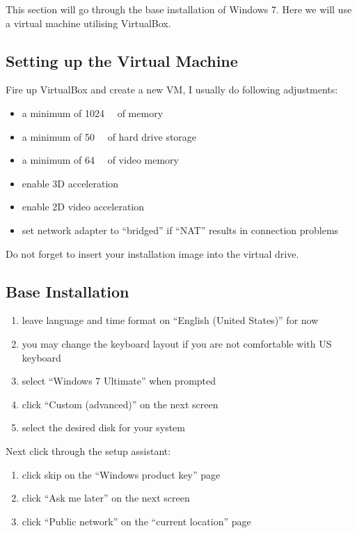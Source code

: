 \documentclass{itsarticle}
\begin{document}
This section will go through the base installation of Windows 7. Here we will
use a virtual machine utilising VirtualBox\footnotemark.


\subsection{Setting up the Virtual Machine}
\label{ssec:virtual_box}

Fire up VirtualBox and create a new VM, I usually do following adjustments:

\begin{itemize}
    \item a minimum of \SI{1024}{\mega\byte} of memory
    \item a minimum of \SI{50}{\giga\byte} of hard drive storage
    \item a minimum of \SI{64}{\mega\byte} of video memory
    \item enable 3D acceleration
    \item enable 2D video acceleration
    \item set network adapter to ``bridged'' if ``NAT'' results in connection
        problems
\end{itemize}

Do not forget to insert your installation image into the virtual drive.

\subsection{Base Installation}
\label{ssec:base_install}

\begin{enumerate}
    \item leave language and time format on ``English (United States)'' for now
    \item you may change the keyboard layout if you are not comfortable with US
        keyboard
    \item select ``Windows 7 Ultimate'' when prompted
    \item click ``Custom (advanced)'' on the next screen
    \item select the desired disk for your system
\end{enumerate}

Next click through the setup assistant:

\begin{enumerate}
    \item click skip on the ``Windows product key'' page
    \item click ``Ask me later'' on the next screen
    \item click ``Public network'' on the ``current location'' page
\end{enumerate}
\end{document}
